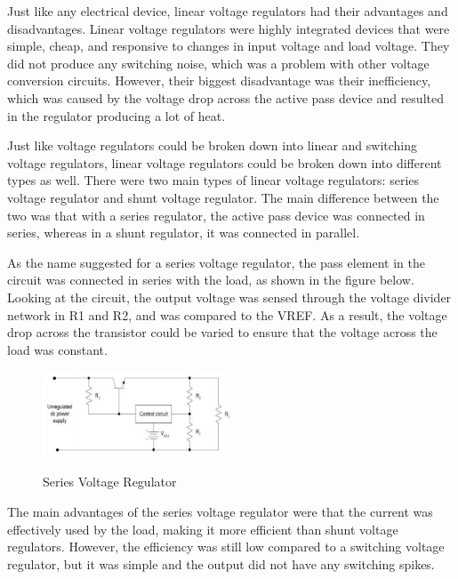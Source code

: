 Just like any electrical device, linear voltage regulators had their advantages and disadvantages. Linear voltage regulators were highly integrated devices that were simple, cheap, and responsive to changes in input voltage and load voltage. They did not produce any switching noise, which was a problem with other voltage conversion circuits. However, their biggest disadvantage was their inefficiency, which was caused by the voltage drop across the active pass device and resulted in the regulator producing a lot of heat.

Just like voltage regulators could be broken down into linear and switching voltage regulators, linear voltage regulators could be broken down into different types as well. There were two main types of linear voltage regulators: series voltage regulator and shunt voltage regulator. The main difference between the two was that with a series regulator, the active pass device was connected in series, whereas in a shunt regulator, it was connected in parallel.

As the name suggested for a series voltage regulator, the pass element in the circuit was connected in series with the load, as shown in the figure below. Looking at the circuit, the output voltage was sensed through the voltage divider network in R1 and R2, and was compared to the VREF. As a result, the voltage drop across the transistor could be varied to ensure that the voltage across the load was constant.
\begin{figure}[H]
    \caption{Series Voltage Regulator}
    \centering
    \includegraphics[width=0.5\textwidth]{images/Series_Voltage_Regulator.png}
    \label{fig:series-voltage-regulator}
\end{figure}
The main advantages of the series voltage regulator were that the current was effectively used by the load, making it more efficient than shunt voltage regulators. However, the efficiency was still low compared to a switching voltage regulator, but it was simple and the output did not have any switching spikes.

